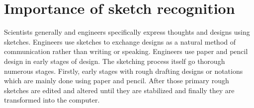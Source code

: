  
  
 
\section{Importance of sketch recognition}
\label{sec:ImportanceOfSketchRecognition}


Scientists generally and engineers specifically express thoughts and designs using sketches. Engineers use sketches to exchange designs as a natural method of communication rather than writing or speaking. Engineers use paper and pencil design in early stages of design. The sketching process itself go thorough numerous stages. Firstly, early stages with rough drafting designs or notations which are mainly done using paper and pencil. After those primary rough sketches are edited and altered until they are stabilized and finally they are transformed into the computer. 




